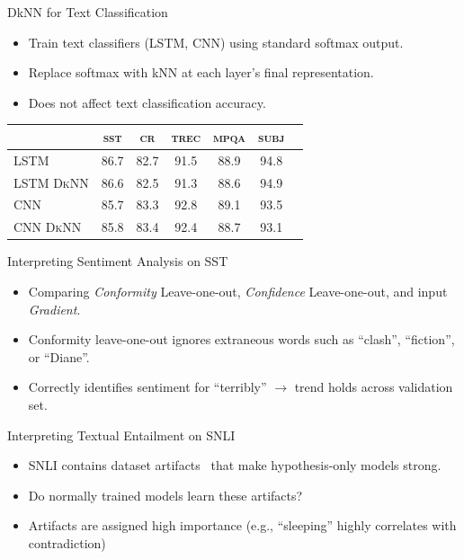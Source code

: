 \documentclass[final]{beamer} %
\newcommand{\abr}[1]{\textsc{#1}}
\newcommand{\dknn}{\textsc{DkNN}}
\newcommand{\lstm}{\textsc{LSTM}}
\newcommand{\cnn}{\textsc{CNN}}
\begin{document}
\begin{frame}
\begin{columns}
\begin{column}{.5\linewidth}
\begin{block}{DkNN for Text Classification}
\begin{itemize}
\item Train text classifiers (LSTM, CNN) using standard softmax output.
\item Replace softmax with kNN at each layer's final representation.
\item Does not affect text classification accuracy.
\end{itemize}
\begin{center}
\begin{tabular}{l|cccccc}
\toprule
& \abr{sst} & \abr{cr} & \abr{trec} & \abr{mpqa} & \abr{subj} \\
\midrule
\lstm{} & 86.7 & 82.7 & 91.5 & 88.9 & 94.8 \\
\lstm{} \dknn{} & 86.6 & 82.5 & 91.3 & 88.6 & 94.9 \\
\cnn{} & 85.7 & 83.3 & 92.8 & 89.1 & 93.5 \\
\cnn{} \dknn{} & 85.8 & 83.4 & 92.4 & 88.7 & 93.1 \\
\end{tabular}
\end{center}
\end{block}

\begin{block}{Interpreting Sentiment Analysis on SST}
\begin{itemize}
\item Comparing \textit{Conformity} Leave-one-out, \textit{Confidence} Leave-one-out, and input \textit{Gradient}.
\item Conformity leave-one-out ignores extraneous words such as ``clash'', ``fiction'', or ``Diane''.
\item Correctly identifies sentiment for ``terribly'' $\to$ trend holds across validation set.
\end{itemize}

\end{block}
\begin{block}{Interpreting Textual Entailment on SNLI}
\begin{itemize}
\item SNLI contains dataset artifacts~\citep{gururangan2018annotation} that make hypothesis-only models strong.
\item Do normally trained models learn these artifacts?
\item Artifacts are assigned high importance (e.g., ``sleeping'' highly correlates with contradiction) 
\end{itemize}

\end{block}


\end{column}
\end{columns}
\end{frame}
\end{document}
